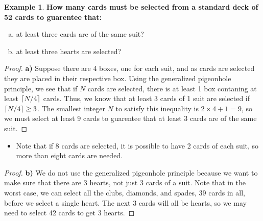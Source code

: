 \documentclass[article, 12pt]{article}
\theoremstyle{definition}
\newtheorem{example}{Example}[subsection]
\DeclarePairedDelimiter\ceil{\lceil}{\rceil} %
\begin{document}
    \begin{example}
        \textbf{How many cards must be selected from a standard deck of 52 cards to guarentee that:}
        \begin{enumerate}[a)]
            \item at least three cards are of the same suit?
            \item at least three hearts are selected?
        \end{enumerate}
        \begin{proof}
            \textbf{a)} Suppose there are 4 boxes, one for each suit, and as cards are selected they are placed in their respective box. Using the generalized pigeonhole principle, we see that if $N$ cards are selected, there is at least 1 box contaning at least $\ceil*{N/4}$ cards. Thus, we know that at least 3 cards of 1 suit are selected if $\ceil*{N/4} \geq 3$. The smallest integer $N$ to satisfy this inequality is $2\times 4+1=9$, so we must select at least 9 cards to guarentee that at least 3 cards are of the same suit.
        \end{proof}
        \begin{itemize}
            \item Note that if 8 cards are selected, it is possible to have 2 cards of each suit, so more than eight cards are needed.
        \end{itemize} 
    \begin{proof}
        \textbf{b)} We do not use the generalized pigeonhole principle because we want to make sure that there are 3 hearts, not just 3 cards of a suit. Note that in the worst case, we can select all the clubs, diamonds, and spades, 39 cards in all, before we select a single heart. The next 3 cards will all be hearts, so we may need to select 42 cards to get 3 hearts.
    \end{proof}
    \end{example}
\end{document}
